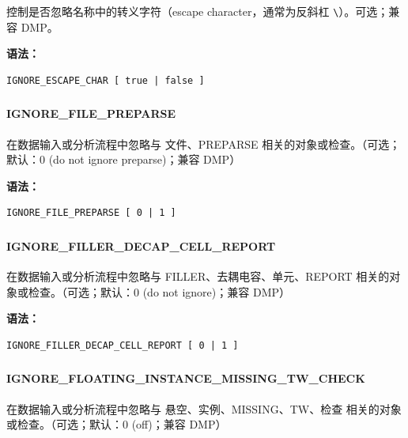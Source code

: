 控制是否忽略名称中的转义字符（escape character，通常为反斜杠 \texttt{\textbackslash}）。可选；兼容 DMP。

\textbf{语法：}
\begin{lstlisting}
IGNORE_ESCAPE_CHAR [ true | false ]
\end{lstlisting}

\subsubsection{}
\paragraph*{IGNORE_FILE_PREPARSE}

在数据输入或分析流程中忽略与 文件、PREPARSE 相关的对象或检查。（可选；默认：0 (do not ignore preparse)；兼容 DMP）

\textbf{语法：}
\begin{lstlisting}
IGNORE_FILE_PREPARSE [ 0 | 1 ]
\end{lstlisting}

\subsubsection{}
\paragraph*{IGNORE_FILLER_DECAP_CELL_REPORT}

在数据输入或分析流程中忽略与 FILLER、去耦电容、单元、REPORT 相关的对象或检查。（可选；默认：0 (do not ignore)；兼容 DMP）

\textbf{语法：}
\begin{lstlisting}
IGNORE_FILLER_DECAP_CELL_REPORT [ 0 | 1 ]
\end{lstlisting}

\subsubsection{}
\paragraph*{IGNORE_FLOATING_INSTANCE_MISSING_TW_CHECK}

在数据输入或分析流程中忽略与 悬空、实例、MISSING、TW、检查 相关的对象或检查。（可选；默认：0 (off)；兼容 DMP）

